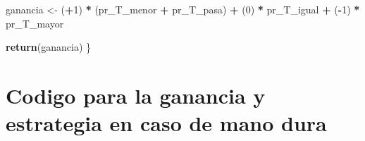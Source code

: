 \documentclass[12pt,a4paper,]{book}
\newenvironment{Shaded}{\begin{snugshade}}{\end{snugshade}}
\newcommand{\DecValTok}[1]{\textcolor[rgb]{0.00,0.00,0.81}{#1}}
\newcommand{\FunctionTok}[1]{\textcolor[rgb]{0.13,0.29,0.53}{\textbf{#1}}}
\newcommand{\NormalTok}[1]{#1}
\newcommand{\OtherTok}[1]{\textcolor[rgb]{0.56,0.35,0.01}{#1}}
\newcommand{\SpecialCharTok}[1]{\textcolor[rgb]{0.81,0.36,0.00}{\textbf{#1}}}
\numberwithin{dummy}{section}
\theoremstyle{ocrenumbox}
\theoremstyle{blacknumex}
\theoremstyle{blacknumbox}
\theoremstyle{ocrenum}
\theoremstyle{ocrenum}
\begin{document}
\begin{Shaded}
\begin{Highlighting}[]
\NormalTok{  ganancia }\OtherTok{\textless{}{-}}\NormalTok{ (}\SpecialCharTok{+}\DecValTok{1}\NormalTok{) }\SpecialCharTok{*}\NormalTok{ (pr\_T\_menor }\SpecialCharTok{+}\NormalTok{ pr\_T\_pasa) }\SpecialCharTok{+}\NormalTok{ (}\DecValTok{0}\NormalTok{) }\SpecialCharTok{*}\NormalTok{ pr\_T\_igual }\SpecialCharTok{+}\NormalTok{ (}\SpecialCharTok{{-}}\DecValTok{1}\NormalTok{) }\SpecialCharTok{*}\NormalTok{ pr\_T\_mayor}
  
  \FunctionTok{return}\NormalTok{(ganancia)}
\NormalTok{\}}
\end{Highlighting}
\end{Shaded}

\hypertarget{codigo-para-la-ganancia-y-estrategia-en-caso-de-mano-dura}{%
\section{Codigo para la ganancia y estrategia en caso de mano
dura}\label{codigo-para-la-ganancia-y-estrategia-en-caso-de-mano-dura}}
\end{document}
